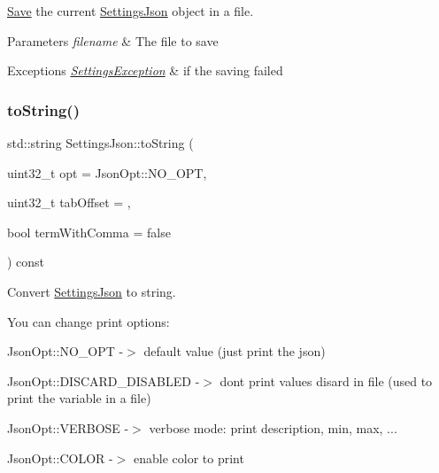 \hyperlink{class_save}{Save} the current \hyperlink{class_settings_json}{Settings\+Json} object in a file. 


\begin{DoxyParams}{Parameters}
{\em filename} & The file to save\\
\hline
\end{DoxyParams}

\begin{DoxyExceptions}{Exceptions}
{\em \hyperlink{class_settings_json_1_1_settings_exception}{Settings\+Exception}} & if the saving failed \\
\hline
\end{DoxyExceptions}
\mbox{\label{class_settings_json_adf9b6991ed9896cc90455a016b5a9f29}} 
\subsubsection{\texorpdfstring{to\+String()}{toString()}}
{\footnotesize\ttfamily std\+::string Settings\+Json\+::to\+String (\begin{DoxyParamCaption}\item[{uint32\+\_\+t}]{opt = {\ttfamily JsonOpt\+:\+:NO\+\_\+OPT},  }\item[{uint32\+\_\+t}]{tab\+Offset = {},  }\item[{bool}]{term\+With\+Comma = {\ttfamily false} }\end{DoxyParamCaption}) const}



Convert \hyperlink{class_settings_json}{Settings\+Json} to string. 

You can change print options\+:
\begin{DoxyItemize}
\item Json\+Opt\+::\+N\+O\+\_\+\+O\+PT -\/$>$ default value (just print the json)
\item Json\+Opt\+::\+D\+I\+S\+C\+A\+R\+D\+\_\+\+D\+I\+S\+A\+B\+L\+ED -\/$>$ dont print values disard in file (used to print the variable in a file)
\item Json\+Opt\+::\+V\+E\+R\+B\+O\+SE -\/$>$ verbose mode\+: print description, min, max, ...
\item Json\+Opt\+::\+C\+O\+L\+OR -\/$>$ enable color to print
\end{DoxyItemize}


